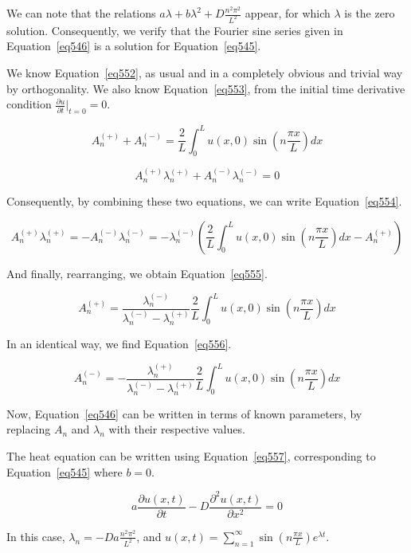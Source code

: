 We can note that the relations $a\lambda + b \lambda^2 + D\frac{n^2\pi^2}{L^2}$ appear, for which $\lambda$ is the zero solution. Consequently, we verify that the Fourier sine series given in Equation~\ref{eq546} is a solution for Equation~\ref{eq545}.

We know Equation~\ref{eq552}, as usual and in a completely obvious and trivial way by orthogonality. We also know Equation~\ref{eq553}, from the initial time derivative condition $\frac{\partial u}{\partial t}\bigg\rvert_{t=0} = 0$.


\begin{equation}\label{eq552}
A_n^{(+)} + A_n^{(-)} = \frac{2}{L} \int_0^L u(x,0) \sin \left( n\frac{\pi x}{L} \right) dx
\end{equation}

\begin{equation}\label{eq553}
A_n^{(+)}\lambda_n^{(+)} + A_n^{(-)}\lambda_n^{(-)} = 0
\end{equation}


Consequently, by combining these two equations, we can write Equation~\ref{eq554}.


\begin{equation}\label{eq554}
A_n^{(+)}\lambda_n^{(+)} = - A_n^{(-)}\lambda_n^{(-)} = - \lambda_n^{(-)} \left( \frac{2}{L} \int_0^L u(x,0) \sin \left( n\frac{\pi x}{L} \right) dx - A_n^{(+)} \right)
\end{equation}

And finally, rearranging, we obtain Equation~\ref{eq555}.


\begin{equation}\label{eq555}
A_n^{(+)} = \frac{\lambda_n^{(-)}}{\lambda_n^{(-)} - \lambda_n^{(+)}} \frac{2}{L} \int_0^L u(x,0) \sin \left( n\frac{\pi x}{L} \right) dx
\end{equation}

In an identical way, we find Equation~\ref{eq556}.

\begin{equation}\label{eq556}
A_n^{(-)} = - \frac{\lambda_n^{(+)}}{\lambda_n^{(-)} - \lambda_n^{(+)}} \frac{2}{L} \int_0^L u(x,0) \sin \left( n\frac{\pi x}{L} \right) dx
\end{equation}

Now, Equation~\ref{eq546} can be written in terms of known parameters, by replacing $A_n$ and $\lambda_n$ with their respective values.


The heat equation can be written using Equation~\ref{eq557}, corresponding to Equation~\ref{eq545} where $b=0$.


\begin{equation}\label{eq557}
a\frac{\partial u(x,t)}{\partial t} - D\frac{\partial^2 u(x,t)}{\partial x^2} = 0
\end{equation}

In this case, $\lambda_n = -Da\frac{n^2\pi^2}{L^2}$, and $u(x,t) = \sum_{n=1}^{\infty} \sin \left( n\frac{\pi x}{L} \right) e^{\lambda t}$.
